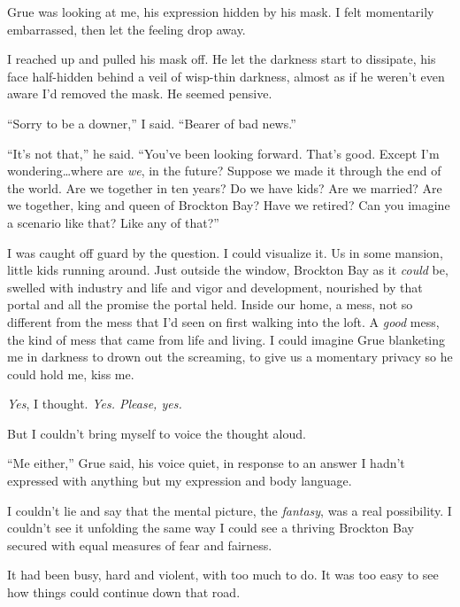 Grue was looking at me, his expression hidden by his mask.  I felt momentarily embarrassed, then let the feeling drop away.



I reached up and pulled his mask off.  He let the darkness start to dissipate, his face half-hidden behind a veil of wisp-thin darkness, almost as if he weren't even aware I'd removed the mask.  He seemed pensive.



``Sorry to be a downer,'' I said.  ``Bearer of bad news.''



``It's not that,'' he said.  ``You've been looking forward.  That's good.  Except I'm wondering\ldots where are \emph{we}, in the future?  Suppose we made it through the end of the world.  Are we together in ten years?  Do we have kids?  Are we married?  Are we together, king and queen of Brockton Bay?  Have we retired?  Can you imagine a scenario like that?  Like any of that?''



I was caught off guard by the question.  I could visualize it.  Us in some mansion, little kids running around.  Just outside the window, Brockton Bay as it \emph{could} be, swelled with industry and life and vigor and development, nourished by that portal and all the promise the portal held.  Inside our home, a mess, not so different from the mess that I'd seen on first walking into the loft.  A \emph{good} mess, the kind of mess that came from life and living.  I could imagine Grue blanketing me in darkness to drown out the screaming, to give us a momentary privacy so he could hold me, kiss me.



\emph{Yes}, I thought.  \emph{Yes.  Please, yes.}



But I couldn't bring myself to voice the thought aloud.



``Me either,'' Grue said, his voice quiet, in response to an answer I hadn't expressed with anything but my expression and body language.



I couldn't lie and say that the mental picture, the \emph{fantasy}, was a real possibility.  I couldn't see it unfolding the same way I could see a thriving Brockton Bay secured with equal measures of fear and fairness.



It had been busy, hard and violent, with too much to do.  It was too easy to see how things could continue down that road.



